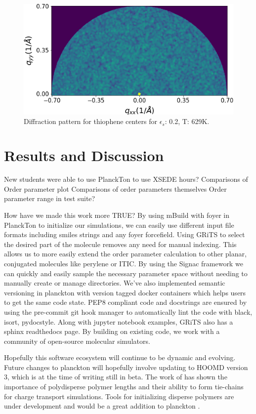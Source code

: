 \begin{figure}
    \centering
    \includegraphics[width=0.8\linewidth]{figures/p3ht_val/cg-trajectory-amorphous_dp0.png}
    \caption{Diffraction pattern for thiophene centers for $\epsilon_{s}$: 0.2, T: 629K.}\label{loworder-dp}
\end{figure}


\section{Results and Discussion}

New students were able to use PlanckTon to use XSEDE hours?
Comparisons of Order parameter plot
Comparisons of order parameters themselves
Order parameter range in test suite?

How have we made this work more TRUE?
By using mBuild with foyer in PlanckTon to initialize our simulations, we can easily use different input file formats including smiles strings and any foyer forcefield. 
Using GRiTS to select the desired part of the molecule removes any need for manual indexing. This allows us to more easily extend the order parameter calculation to other planar, conjugated molecules like perylene or ITIC.
By using the Signac framework we can quickly and easily sample the necessary parameter space without needing to manually create or manage directories. 
We've also implemented semantic versioning in planckton with version tagged docker containers which helps users to get the same code state.
PEP8 compliant code and docstrings are ensured by using the pre-commit git hook manager to automatically lint the code with black, isort, pydocstyle.
Along with jupyter notebook examples, GRiTS also has a sphinx readthedocs page.
By building on existing code, we work with a community of open-source molecular simulators. 

Hopefully this software ecosystem will continue to be dynamic and evolving. Future changes to planckton will hopefully involve updating to HOOMD version 3, which is at the time of writing still in beta. The work of \citet{Miller2018a} has shown the importance of polydisperse polymer lengths and their ability to form tie-chains for charge transport simulations. 
Tools for initializing disperse polymers are under development and would be a great addition to planckton \cite{polybinder}.


